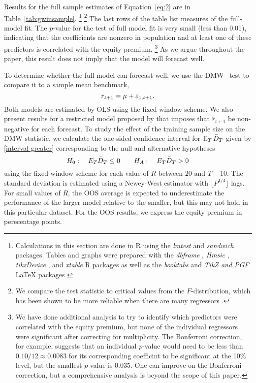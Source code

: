 \documentclass[12pt]{article}
\begin{document}
Results for the full sample estimates of Equation~\eqref{eq:2} are in
Table~\ref{tab:gwinsample}.%
\footnote{Calculations in this section are done in R \citep{Rde:10}
  using the \emph{lmtest} \citep{ZeH:02} and \emph{sandwich}
  \citep{Zei:04} packages. Tables and graphs were prepared with the
  \emph{dbframe} \citep{Cal:10b}, \emph{Hmsic} \citep{Har:10},
  \emph{tikzDevice} \citep{ShB:11:0.6.1}, and \emph{xtable}
  \citep{Dah:09} R packages as well as the \emph{booktabs}
  \citep{FeE:05} and \emph{TikZ and PGF} LaTeX packages
  \citep{Tan:10}}%
\footnote{We compare the test statistic to critical values from the
  $F$-distribution, which has been shown to be more reliable when
  there are many regressors \citep{Ana:12,Cal:11c}.} %
The last rows of the table list measures of the full-model fit.  The
$p$-value for the test of full model fit is very small (less than
0.01), indicating that the coefficients are nonzero in population and
at least one of these predictors is correlated with the equity
premium.%
\footnote{We have done additional analysis to try to identify which
  predictors were correlated with the equity premium, but none of the
  individual regressors were significant after correcting for
  multiplicity. The Bonferroni correction, for example, suggests that
  an individual $p$-value would need to be less than $0.10/12 \approx
  0.0083$ for its corresponding coefficint to be significant at the
  10\% level, but the smallest $p$-value is $0.035$. One can improve
  on the Bonferroni correction, but a comprehensive analysis is beyond
  the scope of this paper.} %
As we argue throughout the paper, this result does not imply that the
model will forecast well.

To determine whether the full model can forecast well, we use the DMW
\oost\ test to compare it to a sample mean benchmark,
\begin{equation}\label{eq:2}
r_{t+1} = \mu + \varepsilon_{1,t+1}.
\end{equation}
Both models are estimated by OLS using the fixed-window scheme. We
also present results for a restricted model proposed by
\citet{CaT:08} that imposes that $\hat r_{t+1}$ be non-negative for
each forecast.
To study the effect of the training sample size on the DMW statistic, we
calculate the one-sided confidence interval for $\operatorname{E}_T \bar{D}_{T}$ given
by \eqref{interval-greater} corresponding to the null and alternative
hypotheses
\[ H_0: \quad E_T \bar{D}_{T} \leq 0 \qquad
H_A: \quad E_T \bar{D}_{T} > 0
\]
using the fixed-window scheme for each value of $R$ between 20 and
$T-10$. The standard deviation is estimated using a Newey-West
estimator with $\lfloor P^{1/4}\rfloor$ lags.  For small values of
$R$, the OOS average is expected to underestimate the performance of
the larger model relative to the smaller, but this may not hold in
this particular dataset. For the OOS results, we express the equity
premium in perecentage points.
\end{document}
